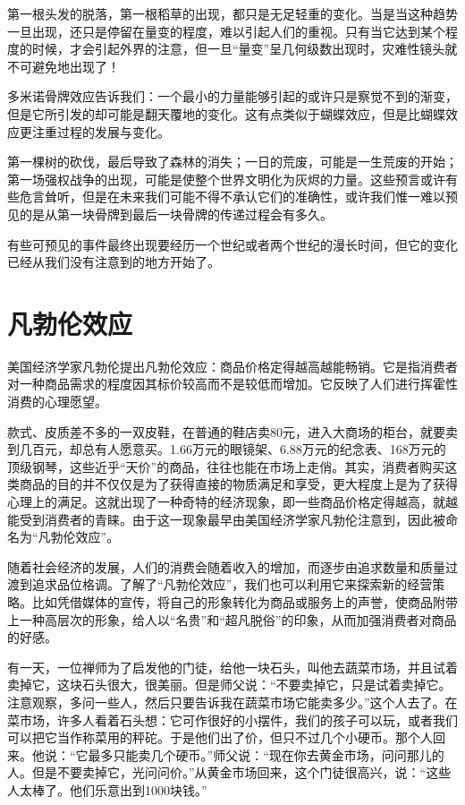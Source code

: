 \documentclass[11pt]{ctexart}
\begin{document}
第一根头发的脱落，第一根稻草的出现，都只是无足轻重的变化。当是当这种趋势一旦出现，还只是停留在量变的程度，难以引起人们的重视。只有当它达到某个程度的时候，才会引起外界的注意，但一旦“量变”呈几何级数出现时，灾难性镜头就不可避免地出现了！

多米诺骨牌效应告诉我们：一个最小的力量能够引起的或许只是察觉不到的渐变，但是它所引发的却可能是翻天覆地的变化。这有点类似于蝴蝶效应，但是比蝴蝶效应更注重过程的发展与变化。

第一棵树的砍伐，最后导致了森林的消失；一日的荒废，可能是一生荒废的开始；第一场强权战争的出现，可能是使整个世界文明化为灰烬的力量。这些预言或许有些危言耸听，但是在未来我们可能不得不承认它们的准确性，或许我们惟一难以预见的是从第一块骨牌到最后一块骨牌的传递过程会有多久。

有些可预见的事件最终出现要经历一个世纪或者两个世纪的漫长时间，但它的变化已经从我们没有注意到的地方开始了。
\section{凡勃伦效应}
\label{sec-35}


美国经济学家凡勃伦提出凡勃伦效应：商品价格定得越高越能畅销。它是指消费者对一种商品需求的程度因其标价较高而不是较低而增加。它反映了人们进行挥霍性消费的心理愿望。

款式、皮质差不多的一双皮鞋，在普通的鞋店卖80元，进入大商场的柜台，就要卖到几百元，却总有人愿意买。1.66万元的眼镜架、6.88万元的纪念表、168万元的顶级钢琴，这些近乎“天价”的商品，往往也能在市场上走俏。其实，消费者购买这类商品的目的并不仅仅是为了获得直接的物质满足和享受，更大程度上是为了获得心理上的满足。这就出现了一种奇特的经济现象，即一些商品价格定得越高，就越能受到消费者的青睐。由于这一现象最早由美国经济学家凡勃伦注意到，因此被命名为“凡勃伦效应”。

随着社会经济的发展，人们的消费会随着收入的增加，而逐步由追求数量和质量过渡到追求品位格调。了解了“凡勃伦效应”，我们也可以利用它来探索新的经营策略。比如凭借媒体的宣传，将自己的形象转化为商品或服务上的声誉，使商品附带上一种高层次的形象，给人以“名贵”和“超凡脱俗”的印象，从而加强消费者对商品的好感。

有一天，一位禅师为了启发他的门徒，给他一块石头，叫他去蔬菜市场，并且试着卖掉它，这块石头很大，很美丽。但是师父说：“不要卖掉它，只是试着卖掉它。注意观察，多问一些人，然后只要告诉我在蔬菜市场它能卖多少。”这个人去了。在菜市场，许多人看着石头想：它可作很好的小摆件，我们的孩子可以玩，或者我们可以把它当作称菜用的秤砣。于是他们出了价，但只不过几个小硬币。那个人回来。他说：“它最多只能卖几个硬币。”师父说：“现在你去黄金市场，问问那儿的人。但是不要卖掉它，光问问价。”从黄金市场回来，这个门徒很高兴，说：“这些人太棒了。他们乐意出到1000块钱。”
\end{document}
